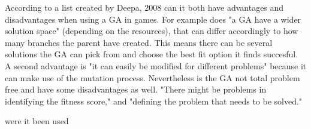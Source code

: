 According to a list created by Deepa, 2008 can it both have advantages and disadvantages when using a GA in games.
For example does "a GA have a wider solution space" (depending on the resources), that can differ accordingly to how many branches the parent have created. This means there can be several solutions the GA can pick from and choose the best fit option it finds succesful.
A second advantage is "it can easily be modified for different problems" because it can make use of the mutation process.
Nevertheless is the GA not total problem free and have some disadvantages as well. "There might be problems in identifying the fitness score," and "defining the problem that needs to be solved."



were it been used





